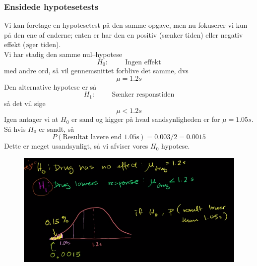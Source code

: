 \documentclass[11pt]{article}
\begin{document}

\subsubsection{Ensidede hypotesetests}
Vi kan foretage en hypotesetest på den samme opgave, men nu fokuserer vi kun på den ene af enderne; enten er har den en positiv (sænker tiden) eller negativ effekt (øger tiden).\\[0.2cm] 
Vi har stadig den samme nul--hypotese
$$H_0:\hspace{1cm}\text{Ingen effekt}$$
med andre ord, så vil gennemsnittet forblive det samme, dvs
$$\mu=1.2s$$
Den alternative hypotese er så
$$H_1:\hspace{1cm}\text{Sænker responstiden}$$
så det vil sige 
$$\mu< 1.2s$$
Igen antager vi at $H_0$ er sand og kigger på hvad sandsynligheden er for $\mu=1.05s$. Så hvis $H_0$ er sandt, så
$$P(\text{Resultat lavere end 1.05s})=0.003/2=0.0015$$
Dette er meget usandsynligt, så vi afviser vores $H_0$ hypotese. 
\begin{figure}[H]
\centering
\includegraphics[scale=0.5]{img/Selection_015}
\end{figure}

\end{document}
